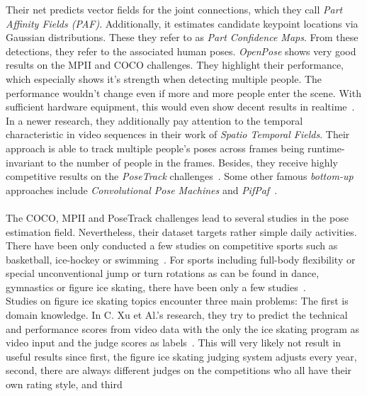     Their net predicts vector fields for the joint connections, which they call \textit{Part Affinity Fields (PAF)}.
    Additionally, it estimates candidate keypoint locations via Gaussian distributions.
    These they refer to as \textit{Part Confidence Maps}.
    From these detections, they refer to the associated human poses.
    \textit{OpenPose} shows very good results on the MPII and COCO challenges.
    They highlight their performance, which especially shows it's strength when detecting multiple people.
    The performance wouldn't change even if more and more people enter the scene.
    With sufficient hardware equipment, this would even show decent results in realtime~\cite{openpose}.\\
    In a newer research, they additionally pay attention to the temporal characteristic in video sequences in
    their work of \textit{Spatio Temporal Fields}.
    Their approach is able to track multiple people's poses across frames being runtime-invariant to the number
    of people in the frames.
    Besides, they receive highly competitive results on the \textit{PoseTrack} challenges~\cite{staf}.
    Some other famous \textit{bottom-up} approaches include \textit{Convolutional Pose Machines} and
    \textit{PifPaf}~\cite{convpose, pifpaf}.
\\\mbox{}\\
    The COCO, MPII and PoseTrack challenges lead to several studies in the pose estimation field.
    Nevertheless, their dataset targets rather simple daily activities.
    There have been only conducted a few studies on competitive sports such as basketball, ice-hockey or
    swimming~\cite{synergetic, posehockey, swimm}.
    For sports including full-body flexibility or special unconventional jump or turn rotations as can be found
    in dance, gymnastics or figure ice skating,
    there have been only a few studies~\cite{dance, figureskatingsimulation, scorefigureskating, fsd10}.\\
    Studies on figure ice skating topics encounter three main problems:
    The first is domain knowledge.
    In C. {Xu} et Al.'s research, they try to predict the technical and performance scores from video data with the
    only the
    ice skating program as video input and the judge scores as labels~\cite{scorefigureskating}.
    This will very likely not result in useful results since first, the figure ice skating judging system adjusts
    every year,
    second, there are always different judges on the competitions who all have their own rating style, and third
